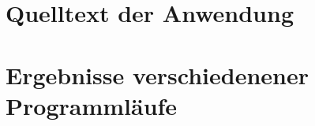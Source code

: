 
\appendix

\section{Quelltext der Anwendung} %
\label{sec:quelltext_der_anwendung}


\section{Ergebnisse verschiedenener Programmläufe} %
\label{sec:ergebnisse_verschiedenener_programmlaufe}


